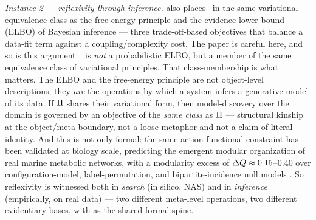 \emph{Instance 2 --- reflexivity through inference.} \citet{frasch2026c} also places \NWAP\ in the same variational equivalence class as the free-energy principle and the evidence lower bound (ELBO) of Bayesian inference --- three trade-off-based objectives that balance a data-fit term against a coupling/complexity cost. The paper is careful here, and so is this argument: \NWAP\ is \emph{not} a probabilistic ELBO, but a member of the same equivalence class of variational principles. That class-membership is what matters. The ELBO and the free-energy principle are not object-level descriptions; they \emph{are} the operations by which a system infers a generative model of its data. If $\Pi$ shares their variational form, then model-discovery over the domain is governed by an objective of the \emph{same class} as $\Pi$ --- structural kinship at the object/meta boundary, not a loose metaphor and not a claim of literal identity. And this is not only formal: the same action-functional constraint has been validated at biology scale, predicting the emergent modular organization of real marine metabolic networks, with a modularity excess of $\Delta Q \approx 0.15$--$0.40$ over configuration-model, label-permutation, and bipartite-incidence null models \citep{frasch2026d}. So reflexivity is witnessed both in \emph{search} (in silico, NAS) and in \emph{inference} (empirically, on real data) --- two different meta-level operations, two different evidentiary bases, with \citeyear{frasch2026c} as the shared formal spine.

